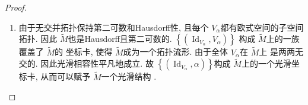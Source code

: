 \documentclass[../main.tex]{subfiles}
\begin{document}
\begin{proof}
\begin{enumerate}
\begin{enumerate}
\[        [O\cap \tilde{M}]_{\sim }= [O\cap \left( \sqcup V_{\alpha } \right) ]_{\sim }= [\sqcup \left( O\cap V_{\alpha } \right) ]_{\sim }= : [ \sqcup  O_{\alpha }]_{\sim }= \bigcup _{\alpha }[O_{\alpha }]_{\sim }
        \]是 \(  \tilde{M}/\sim   \) 上的一个开集. 其中每个 \(  O_{\alpha }  \)都是 \(  V_{\alpha }  \)上的一个开集. 我们有 \[
         \varphi ^{-1} \left( [O]_{\sim } \right)= \bigcup _{ \alpha }  \varphi ^{-1} \left( [O_{\alpha }]_{\sim } \right)=   \bigcup _{\alpha } \varphi _{\alpha }\left( O_{\alpha } \right) 
        \]  是 \(  M  \)上的一个开集. 故 \(   \varphi   \)是一个连续映射. 因此, \(   \varphi   \)是一个同肧映射. \(  \tilde{M}/ \sim   \)与 \(  M  \)同肧.
        \item   由于无交并拓扑保持第二可数和Hausdorff性, 且每个 \(  V_{\alpha }  \)都有欧式空间的子空间拓扑. 因此 \(  \tilde{M}  \)也是Hausdorff且第二可数的.  \(  \left\{ \left( \operatorname{Id}_{V_{\alpha }},V_{\alpha } \right)   \right\} \)   构成 \(  \tilde{M}  \)上的一族覆盖了 \(  \tilde{M}  \)的 坐标卡, 使得 \(  \tilde{M}  \)成为一个拓扑流形.  由于全体 \(  V_{\alpha }  \)在 \(  \tilde{M}  \)上  是两两无交的. 因此光滑相容性平凡地成立. 故 \(  \left\{ \left( \operatorname{Id}_{V_{\alpha }},\alpha  \right)  \right\}  \)构成 \(  \tilde{M}  \)上的一个光滑坐标卡, 从而可以赋予 \(  \tilde{M}  \)一个光滑结构 .  
    \end{enumerate}
    
 \end{enumerate}
 
\end{proof}
\end{document}
